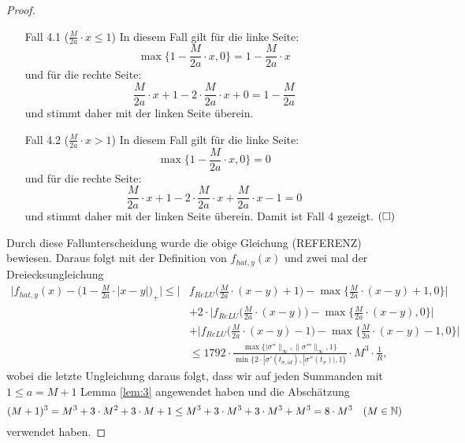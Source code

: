 \begin{proof}
\begin{itemize}
  \item[Fall 4.1] ($\frac{M}{2a} \cdot x \leq 1$) In diesem Fall gilt für die linke Seite$\colon$ 
  $$\max\{1 - \frac{M}{2a} \cdot x, 0\} = 1 - \frac{M}{2a} \cdot x$$ und für die rechte Seite$\colon$ 
  $$\frac{M}{2a} \cdot x + 1 - 2 \cdot \frac{M}{2a} \cdot x + 0 = 1 - \frac{M}{2a}$$ und stimmt daher mit der linken Seite überein.
  \item[Fall 4.2] ($\frac{M}{2a} \cdot x > 1$) In diesem Fall gilt für die linke Seite$\colon$ 
  $$\max\{1 - \frac{M}{2a} \cdot x, 0\} = 0$$ und für die rechte Seite$\colon$ 
  $$\frac{M}{2a} \cdot x + 1 - 2 \cdot \frac{M}{2a} \cdot x + \frac{M}{2a} \cdot x - 1 = 0$$ und stimmt daher mit der linken Seite überein. Damit ist Fall 4 gezeigt. $\hfill(\square)$
\end{itemize} 
Durch diese Fallunterscheidung wurde die obige Gleichung (REFERENZ) bewiesen. Daraus folgt mit der Definition von $f_{hat,y}(x)$ und zwei mal der Dreiecksungleichung
\begin{equation*}
\begin{split}
\bigg|f_{hat,y}(x) - \bigg(1 - \frac{M}{2a} \cdot |x - y|\bigg)_+\bigg| \leq \bigg|&f_{ReLU} \bigg(\frac{M}{2a} \cdot (x - y) + 1\bigg) - \max\{\frac{M}{2a} \cdot (x - y) + 1, 0\}\bigg| \\ 
& + 2 \cdot \bigg|f_{ReLU}\bigg(\frac{M}{2a} \cdot (x - y)\bigg) - \max\{\frac{M}{2a} \cdot (x - y), 0\}\bigg| \\
& + \bigg|f_{ReLU}\bigg(\frac{M}{2a} \cdot (x - y) - 1\bigg) - \max\{\frac{M}{2a} \cdot (x - y) - 1, 0\}\bigg|\\ 
& \leq 1792 \cdot \frac{\max\{|\sigma''\|_{\infty}, \|\sigma'''\|_{\infty}, 1\}}{\min\{2 \cdot |\sigma'(t_{\sigma, id}), |\sigma''(t_{\sigma})|, 1\}} \cdot M^3 \cdot \frac{1}{R},
\end{split}
\end{equation*} 
wobei die letzte Ungleichung daraus folgt, dass wir auf jeden Summanden mit $1 \leq a = M + 1$ Lemma \ref{lem:3} angewendet haben und die Abschätzung 
$$ (M + 1)^3 = M^3 + 3 \cdot M^2 + 3 \cdot M + 1 \leq M^3 + 3 \cdot M^3 + 3 \cdot M ^3 + M^3 = 8 \cdot M^3 \quad (M \in \mathbb{N})$$ verwendet haben.
  \end{proof}